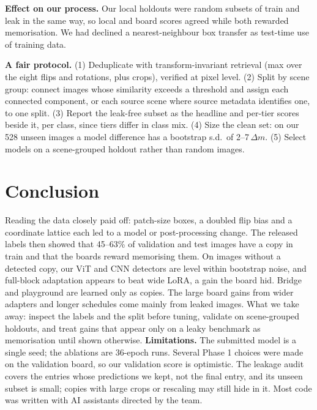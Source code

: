 \documentclass[10pt,twocolumn,letterpaper]{article}
\newcommand{\dm}{\ensuremath{\Delta m}}
\begin{document}
\textbf{Effect on our process.} Our local holdouts were random subsets of train and leak in the same way, so local and board scores agreed while both rewarded memorisation. We had declined a nearest-neighbour box transfer as test-time use of training data.

\textbf{A fair protocol.} (1) Deduplicate with transform-invariant retrieval (max over the eight flips and rotations, plus crops), verified at pixel level. (2) Split by scene group: connect images whose similarity exceeds a threshold and assign each connected component, or each source scene where source metadata identifies one, to one split. (3) Report the leak-free subset as the headline and per-tier scores beside it, per class, since tiers differ in class mix. (4) Size the clean set: on our 528 unseen images a model difference has a bootstrap s.d.\ of 2--7\,\dm. (5) Select models on a scene-grouped holdout rather than random images.

\section{Conclusion}
Reading the data closely paid off: patch-size boxes, a doubled flip bias and a coordinate lattice each led to a model or post-processing change. The released labels then showed that 45--63\% of validation and test images have a copy in train and that the boards reward memorising them. On images without a detected copy, our ViT and CNN detectors are level within bootstrap noise, and full-block adaptation appears to beat wide LoRA, a gain the board hid. Bridge and playground are learned only as copies. The large board gains from wider adapters and longer schedules come mainly from leaked images. What we take away: inspect the labels and the split before tuning, validate on scene-grouped holdouts, and treat gains that appear only on a leaky benchmark as memorisation until shown otherwise.
\textbf{Limitations.} The submitted model is a single seed; the ablations are 36-epoch runs. Several Phase 1 choices were made on the validation board, so our validation score is optimistic. The leakage audit covers the entries whose predictions we kept, not the final entry, and its unseen subset is small; copies with large crops or rescaling may still hide in it. Most code was written with AI assistants directed by the team.
\end{document}

